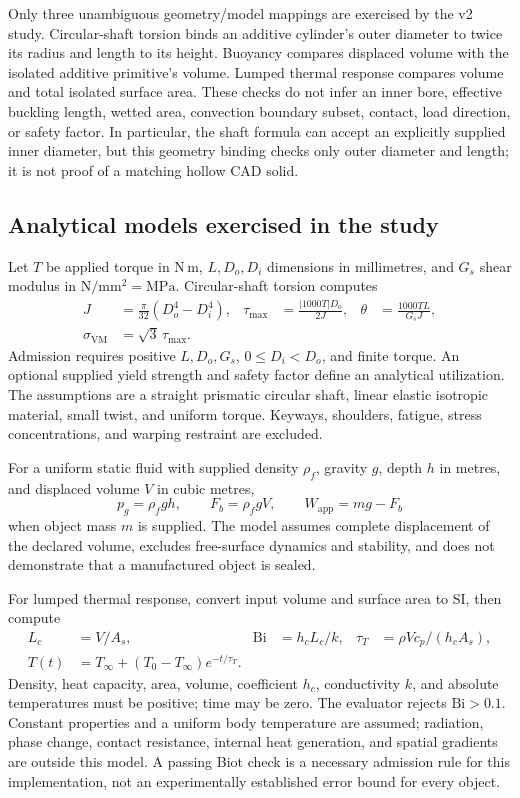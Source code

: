 \documentclass[10pt]{article}
\begin{document}
Only three unambiguous geometry/model mappings are exercised by the v2 study.
Circular-shaft torsion binds an additive cylinder's outer diameter to twice its
radius and length to its height. Buoyancy compares displaced volume with the
isolated additive primitive's volume. Lumped thermal response compares volume
and total isolated surface area. These checks do not infer an inner bore,
effective buckling length, wetted area, convection boundary subset, contact,
load direction, or safety factor. In particular, the shaft formula can accept
an explicitly supplied inner diameter, but this geometry binding checks only
outer diameter and length; it is not proof of a matching hollow CAD solid.

\subsection{Analytical models exercised in the study}

Let \(T\) be applied torque in \(\mathrm{N\,m}\), \(L,D_o,D_i\) dimensions in
millimetres, and \(G_s\) shear modulus in \(\mathrm{N/mm^2}=\mathrm{MPa}\).
Circular-shaft torsion computes
\begin{align}
J&=\frac{\pi}{32}(D_o^4-D_i^4),&
\tau_{\max}&=\frac{|1000T|D_o}{2J},&
\theta&=\frac{1000TL}{G_sJ},\\
\sigma_{\mathrm{VM}}&=\sqrt3\,\tau_{\max}.&&&
\end{align}
Admission requires positive \(L,D_o,G_s\), \(0\le D_i<D_o\), and finite torque.
An optional supplied yield strength and safety factor define an analytical
utilization. The assumptions are a straight prismatic circular shaft, linear
elastic isotropic material, small twist, and uniform torque. Keyways, shoulders,
fatigue, stress concentrations, and warping restraint are excluded.

For a uniform static fluid with supplied density \(\rho_f\), gravity \(g\),
depth \(h\) in metres, and displaced volume \(V\) in cubic metres,
\begin{equation}
p_g=\rho_fgh,\qquad F_b=\rho_fgV,\qquad W_{\mathrm{app}}=mg-F_b
\end{equation}
when object mass \(m\) is supplied. The model assumes complete displacement
of the declared volume, excludes free-surface dynamics and stability, and
does not demonstrate that a manufactured object is sealed.

For lumped thermal response, convert input volume and surface area to SI,
then compute
\begin{align}
L_c&=V/A_s,& \mathrm{Bi}&=h_cL_c/k,&
\tau_T&=\rho Vc_p/(h_cA_s),\\
T(t)&=T_\infty+(T_0-T_\infty)e^{-t/\tau_T}.&&&
\end{align}
Density, heat capacity, area, volume, coefficient \(h_c\), conductivity \(k\),
and absolute temperatures must be positive; time may be zero. The evaluator
rejects \(\mathrm{Bi}>0.1\). Constant properties and a uniform body
temperature are assumed; radiation, phase change, contact resistance,
internal heat generation, and spatial gradients are outside this model.
A passing Biot check is a necessary admission rule for this implementation,
not an experimentally established error bound for every object.
\end{document}
